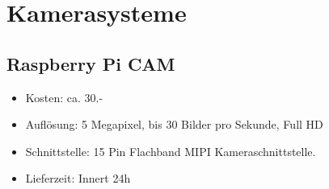 \section{Kamerasysteme}
\subsection{Raspberry Pi CAM}
\begin{itemize}
\item Kosten: ca. 30.-
\item Auflösung: 5 Megapixel, bis 30 Bilder pro Sekunde, Full HD
\item Schnittstelle: 15 Pin Flachband MIPI Kameraschnittstelle.
\item Lieferzeit: Innert 24h
\end{itemize}
